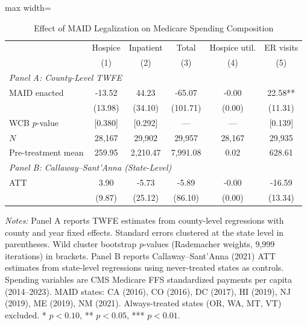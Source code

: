 \begin{table}[H]
\centering
\caption{Effect of MAID Legalization on Medicare Spending Composition}
\label{tab:main}
\begin{adjustbox}{max width=\textwidth}
\begin{threeparttable}
\begin{tabular}{lccccc}
\toprule
& Hospice & Inpatient & Total & Hospice util. & ER visits \\
& (1) & (2) & (3) & (4) & (5) \\
\midrule
\multicolumn{6}{l}{\textit{Panel A: County-Level TWFE}} \\
MAID enacted & -13.52 & 44.23 & -65.07 & -0.00 & 22.58** \\
 & (13.98) & (34.10) & (101.71) & (0.00) & (11.31) \\
WCB $p$-value & [0.380] & [0.292] & --- & --- & [0.139] \\
$N$ & 28,167 & 29,902 & 29,957 & 28,167 & 29,935 \\
Pre-treatment mean & 259.95 & 2,210.47 & 7,991.08 & 0.02 & 628.61 \\
\midrule
\multicolumn{6}{l}{\textit{Panel B: Callaway--Sant'Anna (State-Level)}} \\
ATT & 3.90 & -5.73 & -5.89 & -0.00 & -16.59 \\
 & (9.87) & (25.12) & (86.10) & (0.00) & (13.34) \\
\bottomrule
\end{tabular}
\begin{tablenotes}[flushleft]
\scriptsize
\item \textit{Notes:} Panel A reports TWFE estimates from county-level regressions with county and year fixed effects. Standard errors clustered at the state level in parentheses. Wild cluster bootstrap $p$-values (Rademacher weights, 9,999 iterations) in brackets. Panel B reports Callaway--Sant'Anna (2021) ATT estimates from state-level regressions using never-treated states as controls. Spending variables are CMS Medicare FFS standardized payments per capita (2014--2023). MAID states: CA (2016), CO (2016), DC (2017), HI (2019), NJ (2019), ME (2019), NM (2021). Always-treated states (OR, WA, MT, VT) excluded. * $p<0.10$, ** $p<0.05$, *** $p<0.01$.
\end{tablenotes}
\end{threeparttable}
\end{adjustbox}
\end{table}
